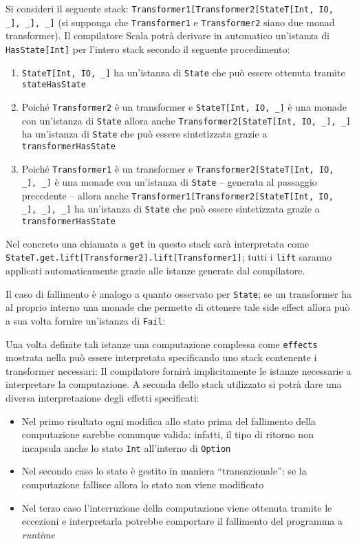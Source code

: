 Si consideri il seguente stack: \lstinline{Transformer1[Transformer2[StateT[Int, IO, _], _], _]} (si supponga che \lstinline{Transformer1} e \lstinline{Transformer2} siano due monad transformer). Il compilatore Scala potrà derivare in automatico un'istanza di \lstinline{HasState[Int]} per l'intero stack secondo il seguente procedimento:
\begin{enumerate}
  \item \lstinline{StateT[Int, IO, _]} ha un'istanza di \lstinline{State} che può essere ottenuta tramite \lstinline{stateHasState}
  \item Poiché \lstinline{Transformer2} è un transformer e \lstinline{StateT[Int, IO, _]} è una monade con un'istanza di \lstinline{State} allora anche \lstinline{Transformer2[StateT[Int, IO, _], _]} ha un'istanza di \lstinline{State} che può essere sintetizzata grazie a \lstinline{transformerHasState}
  \item Poiché \lstinline{Transformer1} è un transformer e \lstinline{Transformer2[StateT[Int, IO, _], _]} è una monade con un'istanza di \lstinline{State} -- generata al passaggio precedente -- allora anche \lstinline{Transformer1[Transformer2[StateT[Int, IO, _], _], _]} ha un'istanza di \lstinline{State} che può essere sintetizzata grazie a \lstinline{transformerHasState}
\end{enumerate}

Nel concreto una chiamata a \lstinline{get} in questo stack sarà interpretata come \lstinline{StateT.get.lift[Transformer2].lift[Transformer1]}; tutti i \lstinline{lift} saranno applicati automaticamente grazie alle istanze generate dal compilatore.

Il caso di fallimento è analogo a quanto osservato per \lstinline{State}; se un transformer ha al proprio interno una monade che permette di ottenere tale side effect allora può a sua volta fornire un'istanza di \lstinline{Fail}:

Una volta definite tali istanze una computazione complessa come \lstinline{effects} mostrata nella  può essere interpretata specificando uno stack contenente i transformer necessari:
Il compilatore fornirà implicitamente le istanze necessarie a interpretare la computazione. A seconda dello stack utilizzato si potrà dare una diversa interpretazione degli effetti specificati:
\begin{itemize}
  \item Nel primo risultato ogni modifica allo stato prima del fallimento della computazione sarebbe comunque valida: infatti, il tipo di ritorno non incapsula anche lo stato \lstinline{Int} all'interno di \lstinline{Option}
  \item Nel secondo caso lo stato è gestito in maniera ``transazionale'': se la computazione fallisce allora lo stato non viene modificato
  \item Nel terzo caso l'interruzione della computazione viene ottenuta tramite le eccezioni e interpretarla potrebbe comportare il fallimento del programma a \emph{runtime}
\end{itemize}
